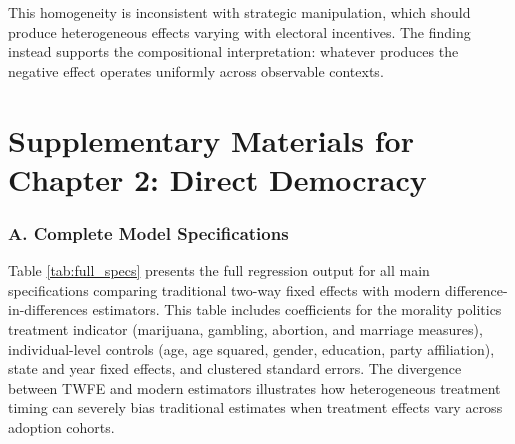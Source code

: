 \documentclass[12pt,letterpaper,oneside]{book}
\newcommand{\basepath}{g:/My Drive/Grad School}
\newcommand{\basepath}{basepath}
\begin{document}
This homogeneity is inconsistent with strategic manipulation, which should produce heterogeneous effects varying with electoral incentives. The finding instead supports the compositional interpretation: whatever produces the negative effect operates uniformly across observable contexts.


\chapter{Supplementary Materials for Chapter 2: Direct Democracy}



\setcounter{table}{0}
\renewcommand{\thetable}{B\arabic{table}}
\setcounter{figure}{0}
\renewcommand{\thefigure}{B\arabic{figure}}

\subsection*{A. Complete Model Specifications}

Table \ref{tab:full_specs} presents the full regression output for all main specifications comparing traditional two-way fixed effects with modern difference-in-differences estimators. This table includes coefficients for the morality politics treatment indicator (marijuana, gambling, abortion, and marriage measures), individual-level controls (age, age squared, gender, education, party affiliation), state and year fixed effects, and clustered standard errors. The divergence between TWFE and modern estimators illustrates how heterogeneous treatment timing can severely bias traditional estimates when treatment effects vary across adoption cohorts.
\end{document}
